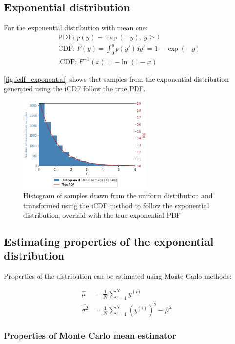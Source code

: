 \documentclass[a4paper]{article}
\begin{document}
\subsection{Exponential distribution}
For the exponential distribution with mean one:
\begin{align*}
    & \text{PDF: } p(y) = \exp(-y), \ y \geq 0 \\
    & \text{CDF: } F(y) = \int_0^y p(y') dy' = 1 - \exp(-y) \\
    & \text{iCDF: } F^{-1}(x) = -\ln(1 - x)
\end{align*}

\autoref{fig:icdf_exponential} shows that samples from the exponential distribution generated using the iCDF follow the
true PDF.

\begin{figure}[h]
    \centering
    \includegraphics[width=0.6\textwidth]{figures/icdf_exponential.png}
    \caption{Histogram of samples drawn from the uniform distribution and transformed using the iCDF method to follow the
    exponential distribution, overlaid with the true exponential PDF}
    \label{fig:icdf_exponential}
\end{figure}

\subsection{Estimating properties of the exponential distribution}

Properties of the distribution can be estimated using Monte Carlo methods:

\begin{align*}
    \hat{\mu} &= \frac{1}{N} \sum_{i=1}^N y^{(i)} \\
    \hat{\sigma^2} &= \frac{1}{N} \sum_{i=1}^N \left(y^{(i)}\right)^2 - \hat{\mu}^2
\end{align*}

\subsubsection{Properties of Monte Carlo mean estimator}
\end{document}

